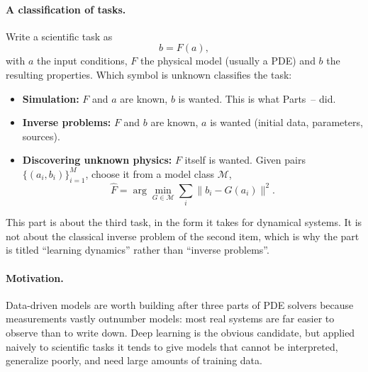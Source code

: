 \paragraph{A classification of tasks.}
Write a scientific task as
\begin{equation}
  b = F(a),
  \label{eq:task}
\end{equation}%
with $a$ the input conditions, $F$ the physical model (usually a PDE) and $b$
the resulting properties. Which symbol is unknown classifies the task:
\begin{itemize}
  \item \textbf{Simulation:} $F$ and $a$ are known, $b$ is wanted. This is what
    Parts~-- did.
  \item \textbf{Inverse problems:} $F$ and $b$ are known, $a$ is wanted
    (initial data, parameters, sources).
  \item \textbf{Discovering unknown physics:} $F$ itself is wanted. Given pairs
    $\{(a_i, b_i)\}_{i=1}^{M}$, choose it from a model class $\mathcal M$,
    \begin{equation}
      \hat F = \arg\min_{G\in\mathcal M} \sum_i \lVert b_i - G(a_i)\rVert^2 .
      \label{eq:discover-physics}
    \end{equation}%
\end{itemize}
This part is about the third task, in the form it takes for dynamical systems.
It is not about the classical inverse problem of the second item, which is why
the part is titled \enquote{learning dynamics} rather than \enquote{inverse
problems}.

\paragraph{Motivation.}
Data-driven models are worth building after three parts of PDE solvers because
measurements vastly outnumber models: most real systems are far easier to
observe than to write down. Deep learning is the obvious candidate, but applied
naively to scientific tasks it tends to give models that cannot be interpreted,
generalize poorly, and need large amounts of training data.

